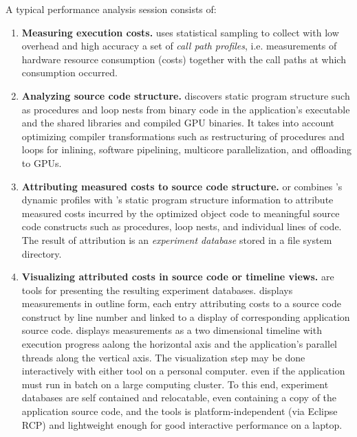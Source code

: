 \documentclass[english]{article}
\begin{document}
A typical performance analysis session consists of:
\begin{enumerate}
\item \textbf{Measuring execution costs.}
 uses statistical sampling to collect with low overhead and high accuracy
a set of \emph{call path profiles},
i.e. measurements of hardware resource consumption (costs) together with the call paths at which consumption occurred.

\item \textbf{Analyzing source code structure.}
 discovers static program structure such as procedures and loop nests
from binary code in the application's executable and the shared libraries and compiled GPU binaries.
It takes into account optimizing compiler transformations such as restructuring of procedures and loops
for inlining, software pipelining, multicore parallelization, and offloading to GPUs.

\item \textbf{Attributing measured costs to source code structure.}
 or 
combines 's dynamic profiles
with 's static program structure information
to attribute measured costs incurred by the optimized object code
to meaningful source code constructs such as procedures, loop nests, and individual lines of code.
The result of attribution is an \emph{experiment database} stored in a file system directory.

\item \textbf{Visualizing attributed costs in source code or timeline views.}
are tools for presenting the resulting experiment databases.
 displays measurements in outline form,
each entry attributing costs to a source code construct by line number
and linked to a display of corresponding application source code.
 displays measurements as a two dimensional timeline
with execution progress aalong the horizontal axis
and the application's parallel threads along the vertical axis.
The visualization step may be done  interactively with either tool on a personal computer.
even if the application must run in batch on a large computing cluster.
To this end, experiment databases are self contained and relocatable,
even containing a copy of the application source code,
and the  tools
is platform-independent (via Eclipse RCP)
and lightweight enough for good interactive performance on a laptop.

\end{enumerate}
\end{document}

